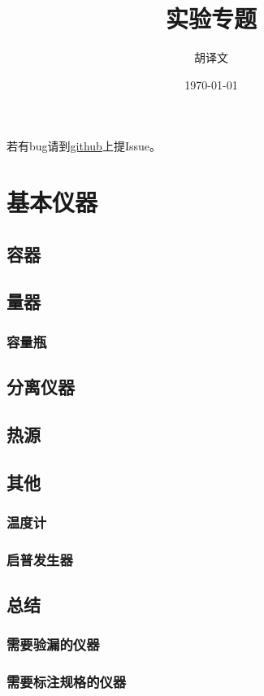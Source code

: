 \documentclass[a4paper]{article}
\title{实验专题}
\author{胡译文}
\date{\today}
\renewcommand\contentsname{目录}
\begin{document}
	\maketitle
	\begin{center}
		若有bug请到{\color{red}\href{https://github.com/huyiwen/Chem}{github}}上提Issue。
	\end{center}
	\renewcommand\contentsname{目录}
	\tableofcontents
	
	\clearpage
	\section{基本仪器}
	\subsection{容器}
	\subsection{量器}
	\subsubsection{容量瓶}
	\subsection{分离仪器}
	\subsection{热源}
	\subsection{其他}
	\subsubsection{温度计}
	\subsubsection{启普发生器}
	\subsection{总结}
	\subsubsection{需要验漏的仪器}
	\subsubsection{需要标注规格的仪器}
	
\end{document}
